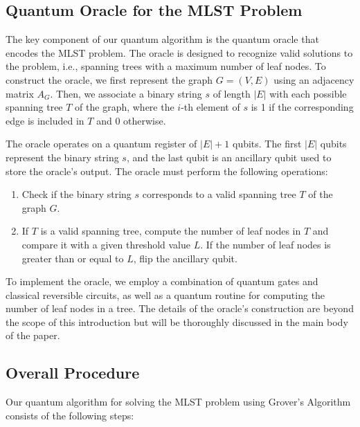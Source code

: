 \subsection{Quantum Oracle for the MLST Problem}
The key component of our quantum algorithm is the quantum oracle that encodes the MLST problem. The oracle is designed to recognize valid solutions to the problem, i.e., spanning trees with a maximum number of leaf nodes. To construct the oracle, we first represent the graph $G = (V, E)$ using an adjacency matrix $A_G$. Then, we associate a binary string $s$ of length $|E|$ with each possible spanning tree $T$ of the graph, where the $i$-th element of $s$ is 1 if the corresponding edge is included in $T$ and 0 otherwise.

The oracle operates on a quantum register of $|E| + 1$ qubits. The first $|E|$ qubits represent the binary string $s$, and the last qubit is an ancillary qubit used to store the oracle's output. The oracle must perform the following operations:

\begin{enumerate}
    \item Check if the binary string $s$ corresponds to a valid spanning tree $T$ of the graph $G$.
    
    \item If $T$ is a valid spanning tree, compute the number of leaf nodes in $T$ and compare it with a given threshold value $L$. If the number of leaf nodes is greater than or equal to $L$, flip the ancillary qubit.
\end{enumerate}

To implement the oracle, we employ a combination of quantum gates and classical reversible circuits, as well as a quantum routine for computing the number of leaf nodes in a tree. The details of the oracle's construction are beyond the scope of this introduction but will be thoroughly discussed in the main body of the paper.

\subsection{Overall Procedure}
Our quantum algorithm for solving the MLST problem using Grover's Algorithm consists of the following steps:

